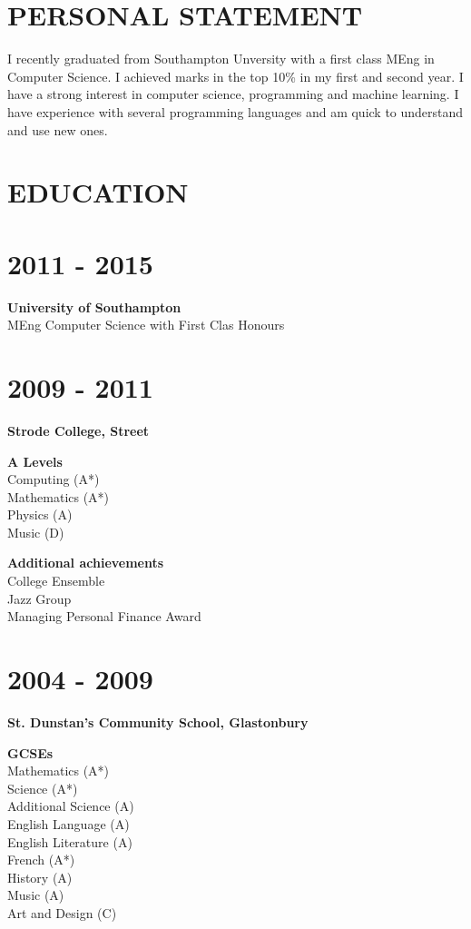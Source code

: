 \documentclass[margin]{res}
\begin{document}
\begin{resume}

\section{PERSONAL STATEMENT}
I recently graduated from Southampton Unversity with a first class MEng in
Computer Science. I achieved marks in the top 10\% in my first and second year.
I have a strong interest in computer science, programming and machine learning.
I have experience with  several programming languages and am quick to
understand and use new ones.

\section{EDUCATION}
\normalsize{\section{2011 - 2015}}
{\bf University of Southampton} \\
MEng Computer Science with First Clas Honours \\
\normalsize{\section{2009 - 2011}}
{\bf Strode College, Street}

{\bf A Levels} \\
Computing (A*) \\
Mathematics (A*) \\
Physics (A) \\
Music (D)

{\bf Additional achievements} \\
College Ensemble \\
Jazz Group \\
Managing Personal Finance Award

\normalsize{\section{2004 - 2009}}
{\bf St. Dunstan's Community School, Glastonbury}

{\bf GCSEs} \\
Mathematics (A*) \\
Science (A*) \\
Additional Science (A) \\
English Language (A) \\
English Literature (A) \\
French (A*) \\
History (A) \\
Music (A) \\
Art and Design (C)


\end{resume}
\end{document}

